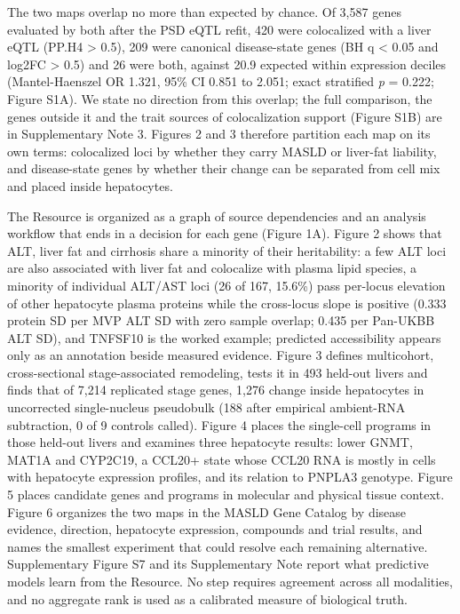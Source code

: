 The two maps overlap no more than expected by chance. Of 3,587 genes evaluated by both after the PSD eQTL refit, 420 were colocalized with a liver eQTL (PP.H4 \textgreater{} 0.5), 209 were canonical disease-state genes (BH q \textless{} 0.05 and \textbar log2FC\textbar{} \textgreater{} 0.5) and 26 were both, against 20.9 expected within expression deciles (Mantel-Haenszel OR 1.321, 95\% CI 0.851 to 2.051; exact stratified \emph{p} = 0.222; Figure S1A). We state no direction from this overlap; the full comparison, the genes outside it and the trait sources of colocalization support (Figure S1B) are in Supplementary Note 3. Figures 2 and 3 therefore partition each map on its own terms: colocalized loci by whether they carry MASLD or liver-fat liability, and disease-state genes by whether their change can be separated from cell mix and placed inside hepatocytes.


The Resource is organized as a graph of source dependencies and an analysis workflow that ends in a decision for each gene (Figure 1A). Figure 2 shows that ALT, liver fat and cirrhosis share a minority of their heritability: a few ALT loci are also associated with liver fat and colocalize with plasma lipid species, a minority of individual ALT/AST loci (26 of 167, 15.6\%) pass per-locus elevation of other hepatocyte plasma proteins while the cross-locus slope is positive (0.333 protein SD per MVP ALT SD with zero sample overlap; 0.435 per Pan-UKBB ALT SD), and TNFSF10 is the worked example; predicted accessibility appears only as an annotation beside measured evidence. Figure 3 defines multicohort, cross-sectional stage-associated remodeling, tests it in 493 held-out livers and finds that of 7,214 replicated stage genes, 1,276 change inside hepatocytes in uncorrected single-nucleus pseudobulk (188 after empirical ambient-RNA subtraction, 0 of 9 controls called). Figure 4 places the single-cell programs in those held-out livers and examines three hepatocyte results: lower GNMT, MAT1A and CYP2C19, a CCL20+ state whose CCL20 RNA is mostly in cells with hepatocyte expression profiles, and its relation to PNPLA3 genotype. Figure 5 places candidate genes and programs in molecular and physical tissue context. Figure 6 organizes the two maps in the MASLD Gene Catalog by disease evidence, direction, hepatocyte expression, compounds and trial results, and names the smallest experiment that could resolve each remaining alternative. Supplementary Figure S7 and its Supplementary Note report what predictive models learn from the Resource. No step requires agreement across all modalities, and no aggregate rank is used as a calibrated measure of biological truth.

